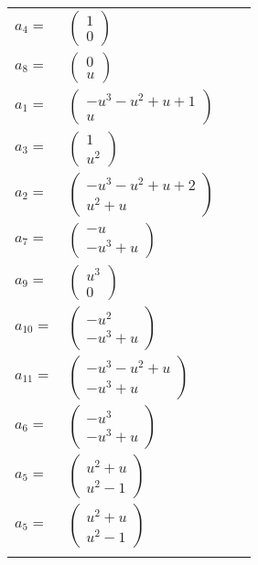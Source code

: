 \documentclass[1p]{elsarticle_modified}
\theoremstyle{definition}
\begin{document}
\begin{tabular}{m{7pt} m{180pt} m{7pt} m{180pt} }
\flushright $a_{4}=$&$\begin{pmatrix}1\\0\end{pmatrix}$ \\
\flushright $a_{8}=$&$\begin{pmatrix}0\\u\end{pmatrix}$ \\
\flushright $a_{1}=$&$\begin{pmatrix}- u^3- u^2+u+1\\u\end{pmatrix}$ \\
\flushright $a_{3}=$&$\begin{pmatrix}1\\u^2\end{pmatrix}$ \\
\flushright $a_{2}=$&$\begin{pmatrix}- u^3- u^2+u+2\\u^2+u\end{pmatrix}$ \\
\flushright $a_{7}=$&$\begin{pmatrix}- u\\- u^3+u\end{pmatrix}$ \\
\flushright $a_{9}=$&$\begin{pmatrix}u^3\\0\end{pmatrix}$ \\
\flushright $a_{10}=$&$\begin{pmatrix}- u^2\\- u^3+u\end{pmatrix}$ \\
\flushright $a_{11}=$&$\begin{pmatrix}- u^3- u^2+u\\- u^3+u\end{pmatrix}$ \\
\flushright $a_{6}=$&$\begin{pmatrix}- u^3\\- u^3+u\end{pmatrix}$ \\
\flushright $a_{5}=$&$\begin{pmatrix}u^2+u\\u^2-1\end{pmatrix}$\\ \flushright $a_{5}=$&$\begin{pmatrix}u^2+u\\u^2-1\end{pmatrix}$\\&\end{tabular}
\end{document}
